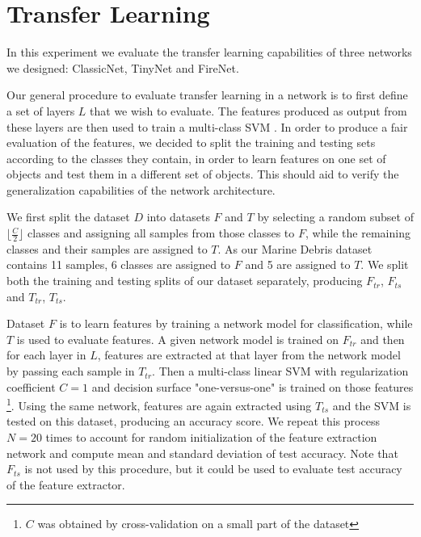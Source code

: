 \section{Transfer Learning}
\label{lim:secTransferLearning}

In this experiment we evaluate the transfer learning capabilities of three networks we designed: ClassicNet, TinyNet and FireNet.

Our general procedure to evaluate transfer learning in a network is to first define a set of layers $L$ that we wish to evaluate. The features produced as output from these layers are then used to train a multi-class SVM \cite{sharif2014cnn}. In order to produce a fair evaluation of the features, we decided to split the training and testing sets according to the classes they contain, in order to learn features on one set of objects and test them in a different set of objects.
This should aid to verify the generalization capabilities of the network architecture.

We first split the dataset $D$ into datasets $F$ and $T$ by selecting a random subset of $\lfloor \frac{C}{2} \rfloor$ classes and assigning all samples from those classes to $F$, while the remaining classes and their samples are assigned to $T$. As our Marine Debris dataset contains 11 samples, 6 classes are assigned to $F$ and 5 are assigned to $T$. We split both the training and testing splits of our dataset separately, producing $F_{tr}$, $F_{ts}$ and $T_{tr}$, $T_{ts}$.

Dataset $F$ is to learn features by training a network model for classification, while $T$ is used to evaluate features. A given network model is trained on $F_{tr}$ and then for each layer in $L$, features are extracted at that layer from the network model by passing each sample in $T_{tr}$. Then a multi-class linear SVM with regularization coefficient $C = 1$  and decision surface "one-versus-one" is trained on those features \footnote{$C$ was obtained by cross-validation on a small part of the dataset}. Using the same network, features are again extracted using $T_{ts}$ and the SVM is tested on this dataset, producing an accuracy score. We repeat this process $N = 20$ times to account for random initialization of the feature extraction network and compute mean and standard deviation of test accuracy. Note that $F_{ts}$ is not used by this procedure, but it could be used to evaluate test accuracy of the feature extractor.

